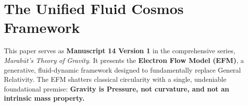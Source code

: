 \documentclass[11pt, a4paper]{article}
\begin{document}
\clearpage
\section*{The Unified Fluid Cosmos Framework}
  This paper serves as \textbf{Manuscript 14 Version 1} in the comprehensive series, \textit{Marab\={u}t's Theory of Gravity}. It presents the \textbf{Electron Flow Model (EFM)}, a generative, fluid-dynamic framework designed to fundamentally replace General Relativity. The EFM shatters classical circularity with a single, undeniable foundational premise: \textbf{Gravity is Pressure, not curvature, and not an intrinsic mass property.}
\end{document}
